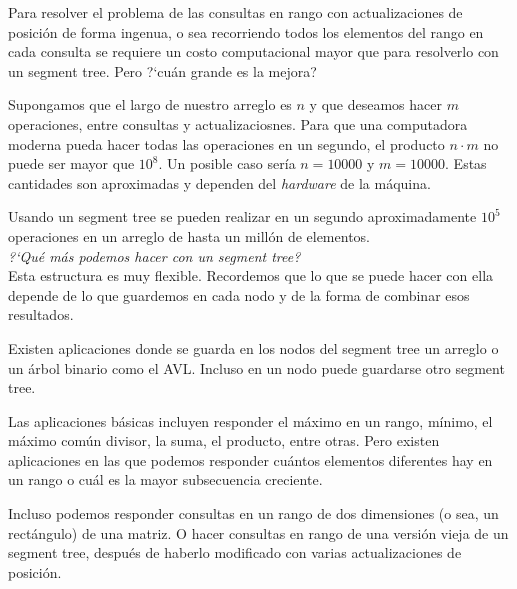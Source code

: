 Para resolver el problema de las consultas en rango con actualizaciones de posici\'on de forma ingenua, o sea recorriendo todos los elementos del rango en cada consulta se requiere un costo computacional mayor que para resolverlo con un segment tree. Pero ?`cu\'an grande es la mejora? 

Supongamos que el largo de nuestro arreglo es $n$ y que deseamos hacer $m$ operaciones, entre consultas y actualizaciosnes. Para que una computadora moderna pueda hacer todas las operaciones en un segundo, el producto $n \cdot m$ no puede ser mayor que $10^8$. Un posible caso ser\'ia $n = 10000$ y $m = 10000$. Estas cantidades son aproximadas y dependen del \textit{hardware} de la m\'aquina.

Usando un segment tree se pueden realizar en un segundo apro\-xi\-ma\-da\-men\-te $10^5$ operaciones en un arreglo de hasta un mill\'on de elementos. \\

\noindent \textit{?`Qu\'e m\'as podemos hacer con un segment tree?} \\
Esta estructura es muy flexible. Recordemos que lo que se puede hacer con ella depende de lo que guardemos en cada nodo y de la forma de combinar esos resultados. 

Existen aplicaciones donde se guarda en los nodos del segment tree un arreglo o un \'arbol binario como el AVL. Incluso en un nodo puede guardarse otro segment tree. 

Las aplicaciones b\'asicas incluyen responder el m\'aximo en un rango, m\'inimo, el m\'aximo com\'un divisor, la suma, el producto, entre otras. Pero existen aplicaciones en las que podemos responder cu\'antos elementos diferentes hay en un rango o cu\'al es la mayor subsecuencia creciente.

Incluso podemos responder consultas en un rango de dos dimensiones (o sea, un rect\'angulo) de una matriz. O hacer consultas en rango de una versi\'on vieja de un segment tree, despu\'es de haberlo modificado con varias actualizaciones de posici\'on. 